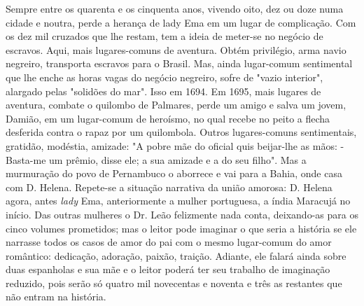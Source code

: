 Sempre entre os quarenta e os cinquenta anos, vivendo oito, dez ou doze
numa cidade e noutra, perde a herança de lady Ema em um lugar de
complicação. Com os dez mil cruzados que lhe restam, tem a ideia de
meter-se no negócio de escravos. Aqui, mais lugares-comuns de aventura.
Obtém privilégio, arma navio negreiro, transporta escravos para o
Brasil. Mas, ainda lugar-comum sentimental que lhe enche as horas vagas
do negócio negreiro, sofre de "vazio interior", alargado pelas "solidões
do mar". Isso em 1694. Em 1695, mais lugares de aventura, combate o
quilombo de Palmares, perde um amigo e salva um jovem, Damião, em um
lugar-comum de heroísmo, no qual recebe no peito a flecha desferida
contra o rapaz por um quilombola. Outros lugares-comuns sentimentais,
gratidão, modéstia, amizade: "A pobre mãe do oficial quis beijar-lhe as
mãos: -Basta-me um prêmio, disse ele; a sua amizade e a do seu filho".
Mas a murmuração do povo de Pernambuco o aborrece e vai para a Bahia,
onde casa com D. Helena. Repete-se a situação narrativa da união
amorosa: D. Helena agora, antes \emph{lady} Ema, anteriormente a mulher
portuguesa, a índia Maracujá no início. Das outras mulheres o Dr. Leão
felizmente nada conta, deixando-as para os cinco volumes prometidos; mas
o leitor pode imaginar o que seria a história se ele narrasse todos os
casos de amor do pai com o mesmo lugar-comum do amor romântico:
dedicação, adoração, paixão, traição. Adiante, ele falará ainda sobre
duas espanholas e sua mãe e o leitor poderá ter seu trabalho de
imaginação reduzido, pois serão só quatro mil novecentas e noventa e
três as restantes que não entram na história.

